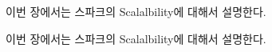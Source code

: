 \fi





\ifkor
이번 장에서는 스파크의 Scalalbility에 대해서 설명한다.
\else

\fi



\ifkor
이번 장에서는 스파크의 Scalalbility에 대해서 설명한다.
\else

\fi


